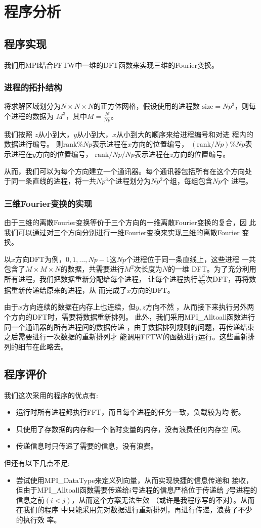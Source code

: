 \documentclass[a4paper,  11pt]{ctexart}
\begin{document}
\section{程序分析}
\subsection{程序实现}
我们用MPI结合FFTW中一维的DFT函数来实现三维的Fourier变换。
\subsubsection{进程的拓扑结构}
将求解区域划分为$N\times N\times N$的正方体网格，假设使用的进程数
$\text{size}=Np^3$，则每个进程的数据为
$M^3$，其中$M=\frac{N}{Np}$。 

我们按照 $z$从小到大，$y$从小到大，$x$从小到大的顺序来给进程编号和对进
程内的数据进行编号。
则$\text{rank}\%Np$表示进程在$x$方向的位置编号，
$(\text{rank}/Np)\%Np$表示进程在$y$方向的位置编号，
$\text{rank}/Np/Np$表示进程在$z$方向的位置编号。

从而，我们可以为每个方向建立一个通讯器。每个通讯器包括所有在这个方向处
于同一条直线的进程，将一共$Np^3$个进程划分为$Np^2$个组，每组包含$Np$个
进程。
\subsubsection{三维Fourier变换的实现}
由于三维的离散Fourier变换等价于三个方向的一维离散Fourier变换的复合，因
此我们可以通过对三个方向分别进行一维Fourier变换来实现三维的离散Fourier
变换。

以$x$方向DFT为例，$0,1,\dots,Np-1$这$Np$个进程位于同一条直线上，这些进程
一共包含了$M\times M\times N$的数据，共需要进行$M^2$次长度为$N$的一维
DFT。为了充分利用所有进程，我们把数据重新分配给每个进程，
让每个进程执行$\frac{M^2}{Np}$次DFT，再将数据重新传递给原来的进程，从
而完成了$x$方向的DFT。

由于$x$方向连续的数据在内存上也连续，但$y,z$方向不然
，从而接下来执行另外两个方向的DFT时，需要将数据重新排列。
此外，我们采用MPI\_Alltoall函数进行同一个通讯器的所有进程间的数据传递
，由于数据排列规则的问题，再传递结束之后需要进行一次数据的重新排列才
能调用FFTW的函数进行运行。这些重新排列的细节在此略去。
\subsection{程序评价}
我们这次采用的程序的优点有:
\begin{itemize}
	\item 运行时所有进程都执行FFT，而且每个进程的任务一致，负载较为均
		衡。
	\item 只使用了存数据的内存和一个临时变量的内存，没有浪费任何内存空
		间。
	\item 传递信息时只传递了需要的信息，没有浪费。
\end{itemize}
但还有以下几点不足:
\begin{itemize}
	\item 尝试使用MPI\_DataType来定义列向量，从而实现快捷的信息传递和
		接收，
		但由于MPI\_Alltoall函数需要传递给$i$号进程的信息严格位于传递给
		$j$号进程的信息之前$(i<j)$，从而这个方案无法生效
		（或许是我程序写的不对）。从而在我们的程序
		中只能采用先对数据进行重新排列，再进行传递，浪费了不少的执行效
		率。
\end{itemize}
\end{document}
